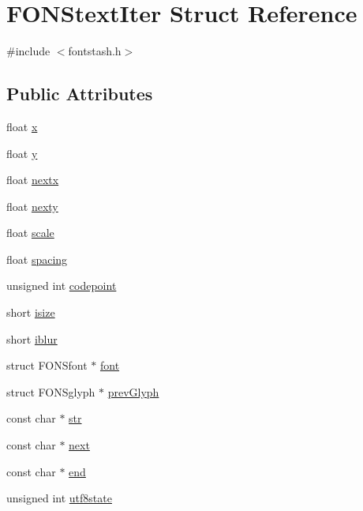 \hypertarget{struct_f_o_n_stext_iter}{\section{F\+O\+N\+Stext\+Iter Struct Reference}
\label{struct_f_o_n_stext_iter}
}


{\ttfamily \#include $<$fontstash.\+h$>$}

\subsection*{Public Attributes}
\begin{DoxyCompactItemize}
\item 
float \hyperlink{struct_f_o_n_stext_iter_a84dee1d692f8d5a0b276a4b3c14305ca}{x}
\item 
float \hyperlink{struct_f_o_n_stext_iter_a67aabad5be6a2e582f855d3fc985e482}{y}
\item 
float \hyperlink{struct_f_o_n_stext_iter_a6467960683f07de34018cdd9bfe03991}{nextx}
\item 
float \hyperlink{struct_f_o_n_stext_iter_a2f3311f7c9c6c182f2d70d9351db2882}{nexty}
\item 
float \hyperlink{struct_f_o_n_stext_iter_a5738db7ad58f0e63b18ea45749a19b1a}{scale}
\item 
float \hyperlink{struct_f_o_n_stext_iter_a9918e73c1fa648fe7381825f0a4e1580}{spacing}
\item 
unsigned int \hyperlink{struct_f_o_n_stext_iter_aa5f74c11fa7741d0050e5a1840169ffd}{codepoint}
\item 
short \hyperlink{struct_f_o_n_stext_iter_ad19f972c53904750e404160b6d69b8ff}{isize}
\item 
short \hyperlink{struct_f_o_n_stext_iter_ae337cf367c38b8ebb02b417e261f7142}{iblur}
\item 
struct F\+O\+N\+Sfont $\ast$ \hyperlink{struct_f_o_n_stext_iter_adca38e1f79a9b30af70f68f660b048a4}{font}
\item 
struct F\+O\+N\+Sglyph $\ast$ \hyperlink{struct_f_o_n_stext_iter_a03a60d063cca83242aa67f5658705ce8}{prev\+Glyph}
\item 
const char $\ast$ \hyperlink{struct_f_o_n_stext_iter_afa9f4ba21030480d65c7fd4f1eab477c}{str}
\item 
const char $\ast$ \hyperlink{struct_f_o_n_stext_iter_a18c670e9f18e733be4c92cd7e9b74ad3}{next}
\item 
const char $\ast$ \hyperlink{struct_f_o_n_stext_iter_ad92484b2073e6000da97840175852013}{end}
\item 
unsigned int \hyperlink{struct_f_o_n_stext_iter_a325cc1ced940302cd1685adc6781de19}{utf8state}
\end{DoxyCompactItemize}


